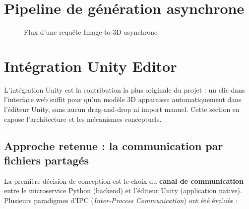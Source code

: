 \documentclass[12pt,a4paper,oneside]{report}
\begin{document}
\section{Pipeline de génération asynchrone}

\begin{figure}[H]
\centering
{}
\caption{Flux d'une requête Image-to-3D asynchrone}
\label{fig:flow}
\end{figure}

\section{Intégration Unity Editor}
\label{sec:unity-mcp}

L'intégration Unity est la contribution la plus originale du projet :
un clic dans l'interface web suffit pour qu'un modèle 3D apparaisse
automatiquement dans l'éditeur Unity, sans aucun drag-and-drop ni
import manuel. Cette section en expose l'architecture et les
mécanismes conceptuels.

\subsection{Approche retenue : la communication par fichiers partagés}

La première décision de conception est le choix du \textbf{canal de
communication} entre le microservice Python (backend) et l'éditeur
Unity (application native). Plusieurs paradigmes d'IPC
(\textit{Inter-Process Communication}) ont été évalués :
\end{document}
